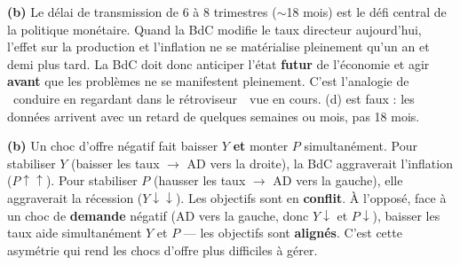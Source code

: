 \begin{reponse}
\textbf{(b)} Le délai de transmission de 6 à 8 trimestres ($\sim$18 mois) est le défi central de la politique monétaire. Quand la BdC modifie le taux directeur aujourd'hui, l'effet sur la production et l'inflation ne se matérialise pleinement qu'un an et demi plus tard. La BdC doit donc anticiper l'état \textbf{futur} de l'économie et agir \textbf{avant} que les problèmes ne se manifestent pleinement. C'est l'analogie de \guillemotleft~conduire en regardant dans le rétroviseur~\guillemotright\ vue en cours. (d) est faux : les données arrivent avec un retard de quelques semaines ou mois, pas 18 mois.
\end{reponse}


\begin{reponse}
\textbf{(b)} Un choc d'offre négatif fait baisser $Y$ \textbf{et} monter $P$ simultanément. Pour stabiliser $Y$ (baisser les taux $\to$ AD vers la droite), la BdC aggraverait l'inflation ($P \uparrow\uparrow$). Pour stabiliser $P$ (hausser les taux $\to$ AD vers la gauche), elle aggraverait la récession ($Y \downarrow\downarrow$). Les objectifs sont en \textbf{conflit}. À l'opposé, face à un choc de \textbf{demande} négatif (AD vers la gauche, donc $Y \downarrow$ et $P \downarrow$), baisser les taux aide simultanément $Y$ et $P$ --- les objectifs sont \textbf{alignés}. C'est cette asymétrie qui rend les chocs d'offre plus difficiles à gérer.
\end{reponse}


